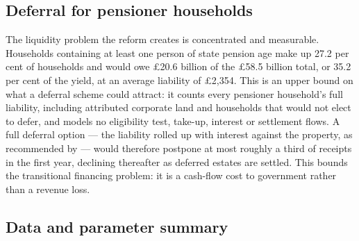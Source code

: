 \subsection{Deferral for pensioner households}

The liquidity problem the reform creates is concentrated and measurable. Households containing at least one person of state pension age make up 27.2 per cent of households and would owe \pounds 20.6 billion of the \pounds 58.5 billion total, or 35.2 per cent of the yield, at an average liability of \pounds 2{,}354. This is an upper bound on what a deferral scheme could attract: it counts every pensioner household's full liability, including attributed corporate land and households that would not elect to defer, and models no eligibility test, take-up, interest or settlement flows. A full deferral option --- the liability rolled up with interest against the property, as recommended by \citet{mirrlees2011} --- would therefore postpone at most roughly a third of receipts in the first year, declining thereafter as deferred estates are settled. This bounds the transitional financing problem: it is a cash-flow cost to government rather than a revenue loss.

\subsection{Data and parameter summary}

